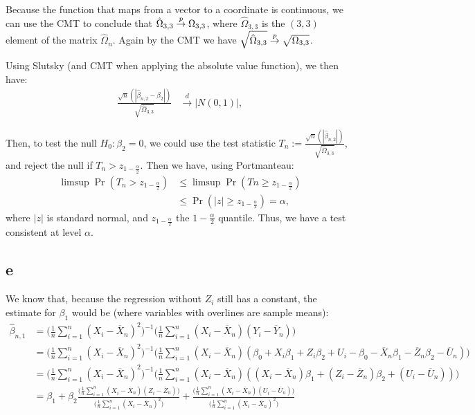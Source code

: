 \documentclass[12pt]{paper}
\begin{document}
Because the function that maps from a vector to a coordinate is continuous, we can use the CMT to conclude that $\hat{\Omega}_{3,3}\overset{p}{\to}\Omega_{3,3}$, where $\hat{\Omega}_{3,3}$ is the $(3,3)$ element of the matrix $\hat{\Omega}_n$. Again by the CMT we have $\sqrt{\hat{\Omega}_{3,3}}\overset{p}{\to}\sqrt{\Omega_{3,3}}$.

Using Slutsky (and CMT when applying the absolute value function), we then have:
\begin{equation}
\begin{split}
\frac{\sqrt{n}(|\hat{\beta}_{n,2}-\beta_2|)}{\sqrt{\hat{\Omega}_{3,3}}}&\overset{d}{\to}|N(0,1)|,
\end{split}
\end{equation}

Then, to test the null $H_0: \beta_2=0$, we could use the test statistic $T_n:=\frac{\sqrt{n}(|\hat{\beta}_{n,2}|)}{\sqrt{\hat{\Omega}_{3,3}}}$, and reject the null if $T_n>z_{1-\frac{\alpha}{2}}$. Then we have, using Portmanteau:
\begin{equation}
\begin{split}
\limsup{\Pr(T_n>z_{1-\frac{\alpha}{2}})}&\le \limsup{\Pr(Tn\ge z_{1-\frac{\alpha}{2}})}\\
&\le \Pr(|z|\ge z_{1-\frac{\alpha}{2}})=\alpha,
\end{split}
\end{equation}
\noindent where $|z|$ is standard normal, and $z_{1-\frac{\alpha}{2}}$ the $1-\frac{\alpha}{2}$ quantile. Thus, we have a test consistent at level $\alpha$.

\subsection*{e}

We know that, because the regression without $Z_i$ still has a constant, the estimate for $\beta_1$ would be (where variables with overlines are sample means):
\begin{equation}
\begin{split}
\hat{\beta}_{n,1}&=\big(\frac{1}{n}\sum_{i=1}^{n}{(X_i-\overline{X}_n)^2}\big)^{-1}\big(\frac{1}{n}\sum_{i=1}^{n}{(X_i-\overline{X}_n)(Y_i-\overline{Y}_n)}\big)\\
&=\big(\frac{1}{n}\sum_{i=1}^{n}{(X_i-\overline{X}_n)^2}\big)^{-1}\big(\frac{1}{n}\sum_{i=1}^{n}{(X_i-\overline{X}_n)(\beta_0+X_i\beta_1+Z_i\beta_2+U_i-\beta_0-\overline{X}_n\beta_1-\overline{Z}_n\beta_2-\overline{U}_n)}\big)\\
&=\big(\frac{1}{n}\sum_{i=1}^{n}{(X_i-\overline{X}_n)^2}\big)^{-1}\big(\frac{1}{n}\sum_{i=1}^{n}{(X_i-\overline{X}_n)((X_i-\overline{X}_n)\beta_1+(Z_i-\overline{Z}_n)\beta_2+(U_i-\overline{U}_n))}\big)\\
&=\beta_1+\beta_2\frac{\big(\frac{1}{n}\sum_{i=1}^{n}{(X_i-\overline{X}_n)(Z_i-\overline{Z}_n)}\big)}{\big(\frac{1}{n}\sum_{i=1}^{n}{(X_i-\overline{X}_n)^2}\big)}+\frac{\big(\frac{1}{n}\sum_{i=1}^{n}{(X_i-\overline{X}_n)(U_i-\overline{U}_n)}\big)}{\big(\frac{1}{n}\sum_{i=1}^{n}{(X_i-\overline{X}_n)^2}\big)}
\end{split}
\end{equation}
\end{document}
